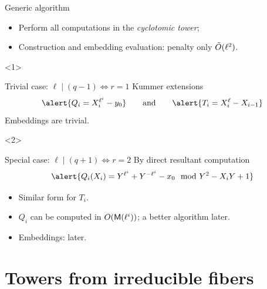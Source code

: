 \documentclass[12pt]{beamer}
\begin{document}
\begin{frame}
  \frametitle{\insertsection }

  \begin{block}{Generic algorithm}
    \begin{itemize}
    \item Perform all computations in the \emph{cyclotomic tower};
    \item Construction and embedding evaluation: penalty only \alert{$\tilde{O}(\ell^2)$}.
    \end{itemize}
  \end{block}

  \begin{overlayarea}{\textwidth}{5cm}
    \begin{onlyenv}<1>
      \begin{block}{Trivial case: $\ell \mid (q-1) \Leftrightarrow r=1$}
        Kummer extensions
        \[\alert{Q_i=X_i^{\ell^i}-y_0} \qquad\text{and}\qquad \alert{T_i=X_{i}^\ell-X_{i-1}}\]
        Embeddings are trivial.
      \end{block}
    \end{onlyenv}	

    \begin{onlyenv}<2>
      \begin{block}{Special case: $\ell \mid (q + 1) \Leftrightarrow r = 2$}
        By direct resultant computation
        \[\alert{Q_i(X_i) = Y^{\ell^i} + Y^{-\ell^i} - x_0 \mod Y^2-X_iY+1}\]

        \vspace*{-3mm}
        \begin{itemize}
        \item Similar form for $T_i$.
        \item $Q_i$ can be computed in $O(\mathsf{M}(\ell^i))$; a better algorithm \alert{later}.
        \item Embeddings: \alert{later}.
        \end{itemize}
      \end{block}
    \end{onlyenv}	
  \end{overlayarea}
\end{frame}



\section{Towers from irreducible fibers}
\end{document}
